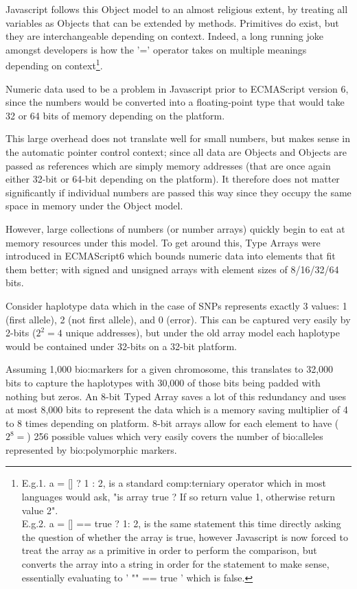 Javascript follows this Object model to an almost religious extent, by treating all variables as Objects that can be extended by methods. Primitives do exist, but they are interchangeable depending on context. Indeed, a long running joke amongst developers is how the '=' operator takes on multiple meanings depending on context\footnote{

\noindent
E.g.1.		a = [] ? 1 : 2, is a standard \gls{comp:terniary} operator which in most languages would ask, "is array true ? If so return value 1, otherwise return value 2".\\\noindent
E.g.2.		a = [] == true ? 1: 2,  is the same statement this time directly asking the question of whether the array is true, however Javascript is now forced to treat the array as a primitive in order to perform the comparison, but converts the array into a string in order for the statement to make sense, essentially evaluating to ' "" == true ' which is false.
}.

Numeric data used to be a problem in Javascript prior to ECMAScript version 6, since the numbers would be converted into a floating-point type that would take 32 or 64 bits of memory depending on the platform. 

This large overhead does not translate well for small numbers, but makes sense in the automatic pointer control context; since all data are Objects and Objects are passed as references which are simply memory addresses (that are once again either 32-bit or 64-bit depending on the platform). It therefore does not matter significantly if individual numbers are passed this way since they occupy the same space in memory under the Object model. 

However, large collections of numbers (or number arrays) quickly begin to eat at memory resources under this model. To get around this, Type Arrays were introduced in ECMAScript6 which bounds numeric data into elements that fit them better; with signed and unsigned arrays with element sizes of 8/16/32/64 bits.

Consider haplotype data which in the case of SNPs represents exactly 3 values: 1 (first allele), 2 (not first allele), and 0 (error). This can be captured very easily by 2-bits ($2^2 = 4$ unique addresses), but under the old array model each haplotype would be contained under 32-bits on a 32-bit platform.

Assuming 1,000 \gls{bio:markers} for a given chromosome, this translates to 32,000 bits to capture the haplotypes with 30,000 of those bits being padded with nothing but zeros. An 8-bit Typed Array saves a lot of this redundancy and uses at most 8,000 bits to represent the data which is a memory saving multiplier of 4 to 8 times depending on platform. 8-bit arrays allow for each element to have ($2^8 =$) 256 possible values which very easily covers the number of \gls{bio:alleles} represented by \gls{bio:polymorphic} markers.

